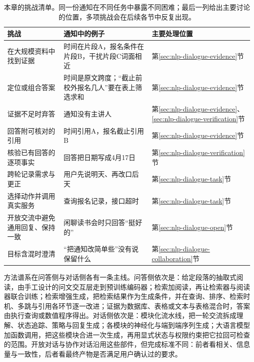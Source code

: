 \begin{table}[htbp]
  \centering
  \small
  \begin{tabularx}{\linewidth}{@{}>{\raggedright\arraybackslash}p{38mm}
    >{\raggedright\arraybackslash}X>{\raggedright\arraybackslash}p{24mm}@{}}
    \toprule
    挑战 & 通知中的例子 & 主要处理位置\\
    \midrule
    在大规模资料中找到证据 & 时间在片段A，报名条件在片段B，干扰片段C词面相近 & 第\ref{sec:nlp-dialogue-evidence}节\\
    定位或组合答案 & 时间是原文跨度；“截止前校外报名几人”要在表上筛选求和 & 第\ref{sec:nlp-dialogue-evidence}节\\
    证据不足时弃答 & 通知没有主讲人 & 第\ref{sec:nlp-dialogue-evidence}、\ref{sec:nlp-dialogue-verification}节\\
    回答附可核对的引用 & 时间引用A，报名截止引用B & 第\ref{sec:nlp-dialogue-evidence}节\\
    核验已有回答的逐项事实 & 回答把日期写成4月17日 & 第\ref{sec:nlp-dialogue-verification}节\\
    跨轮记录需求与更正 & 用户先说明天、再改口后天 & 第\ref{sec:nlp-dialogue-task}节\\
    选择动作并调用真实服务 & 查询报名记录，接口超时 & 第\ref{sec:nlp-dialogue-task}节\\
    开放交流中避免通用回复、保持一致 & 闲聊读书会时只回答“挺好的” & 第\ref{sec:nlp-dialogue-open}节\\
    目标含混时澄清 & “把通知改简单些”没有说保留什么 & 第\ref{sec:nlp-dialogue-collaboration}节\\
    \bottomrule
  \end{tabularx}
  \caption{本章的挑战清单。同一份通知在不同任务中暴露不同困难；最后一列给出主要讨论的位置，多项挑战会在后续各节中反复出现。}
  \label{tab:nlp-dialogue-challenges}
\end{table}

方法谱系在问答侧与对话侧各有一条主线。问答侧依次是：给定段落的抽取式阅读，由手工设计的问文交互层走到预训练编码器；检索加阅读，再让检索器与阅读器联合训练；检索增强生成，把检索结果作为生成条件，并在查询、排序、检索时机、多跳与引用各环节逐一改进；证据为数据库、表格或文本与表格混合时，答案由执行查询或数值程序得出。对话侧依次是：模块化流水线，把一轮交流拆成理解、状态追踪、策略与回复生成；各模块的神经化与端到端序列生成；大语言模型加函数调用，把这些模块合进一次生成，再用显式状态与权限约束把它拉回可检查的范围。开放对话与协作对话沿用这些部件，但完成标准不同：前者看相关、信息量与一致性，后者看最终产物是否满足用户确认过的要求。

